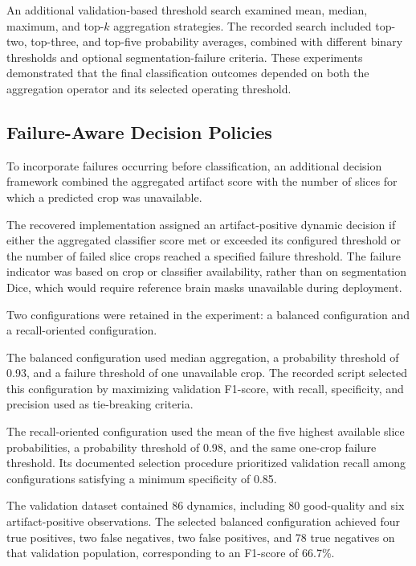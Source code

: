 An additional validation-based threshold search examined mean, median, maximum, and top-$k$ aggregation strategies. The recorded search included top-two, top-three, and top-five probability averages, combined with different binary thresholds and optional segmentation-failure criteria. These experiments demonstrated that the final classification outcomes depended on both the aggregation operator and its selected operating threshold.


\subsection{Failure-Aware Decision Policies}
\label{subsec:results_failure_aware_policies}

To incorporate failures occurring before classification, an additional decision framework combined the aggregated artifact score with the number of slices for which a predicted crop was unavailable.

The recovered implementation assigned an artifact-positive dynamic decision if either the aggregated classifier score met or exceeded its configured threshold or the number of failed slice crops reached a specified failure threshold. The failure indicator was based on crop or classifier availability, rather than on segmentation Dice, which would require reference brain masks unavailable during deployment.

Two configurations were retained in the experiment: a balanced configuration and a recall-oriented configuration.

The balanced configuration used median aggregation, a probability threshold of 0.93, and a failure threshold of one unavailable crop. The recorded script selected this configuration by maximizing validation F1-score, with recall, specificity, and precision used as tie-breaking criteria.

The recall-oriented configuration used the mean of the five highest available slice probabilities, a probability threshold of 0.98, and the same one-crop failure threshold. Its documented selection procedure prioritized validation recall among configurations satisfying a minimum specificity of 0.85.

The validation dataset contained 86 dynamics, including 80 good-quality and six artifact-positive observations. The selected balanced configuration achieved four true positives, two false negatives, two false positives, and 78 true negatives on that validation population, corresponding to an F1-score of 66.7\%.

